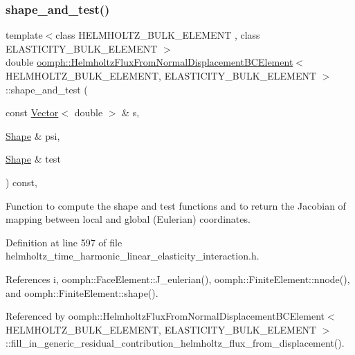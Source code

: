 \subsubsection{\texorpdfstring{shape\+\_\+and\+\_\+test()}{shape\_and\_test()}}
{\footnotesize\ttfamily template$<$class H\+E\+L\+M\+H\+O\+L\+T\+Z\+\_\+\+B\+U\+L\+K\+\_\+\+E\+L\+E\+M\+E\+NT , class E\+L\+A\+S\+T\+I\+C\+I\+T\+Y\+\_\+\+B\+U\+L\+K\+\_\+\+E\+L\+E\+M\+E\+NT $>$ \\
double \hyperlink{classoomph_1_1HelmholtzFluxFromNormalDisplacementBCElement}{oomph\+::\+Helmholtz\+Flux\+From\+Normal\+Displacement\+B\+C\+Element}$<$ H\+E\+L\+M\+H\+O\+L\+T\+Z\+\_\+\+B\+U\+L\+K\+\_\+\+E\+L\+E\+M\+E\+NT, E\+L\+A\+S\+T\+I\+C\+I\+T\+Y\+\_\+\+B\+U\+L\+K\+\_\+\+E\+L\+E\+M\+E\+NT $>$\+::shape\+\_\+and\+\_\+test (\begin{DoxyParamCaption}\item[{const \hyperlink{classoomph_1_1Vector}{Vector}$<$ double $>$ \&}]{s,  }\item[{\hyperlink{classoomph_1_1Shape}{Shape} \&}]{psi,  }\item[{\hyperlink{classoomph_1_1Shape}{Shape} \&}]{test }\end{DoxyParamCaption}) const\hspace{0.3cm}{\ttfamily [inline]}, {\ttfamily [protected]}}



Function to compute the shape and test functions and to return the Jacobian of mapping between local and global (Eulerian) coordinates. 



Definition at line 597 of file helmholtz\+\_\+time\+\_\+harmonic\+\_\+linear\+\_\+elasticity\+\_\+interaction.\+h.



References i, oomph\+::\+Face\+Element\+::\+J\+\_\+eulerian(), oomph\+::\+Finite\+Element\+::nnode(), and oomph\+::\+Finite\+Element\+::shape().



Referenced by oomph\+::\+Helmholtz\+Flux\+From\+Normal\+Displacement\+B\+C\+Element$<$ H\+E\+L\+M\+H\+O\+L\+T\+Z\+\_\+\+B\+U\+L\+K\+\_\+\+E\+L\+E\+M\+E\+N\+T, E\+L\+A\+S\+T\+I\+C\+I\+T\+Y\+\_\+\+B\+U\+L\+K\+\_\+\+E\+L\+E\+M\+E\+N\+T $>$\+::fill\+\_\+in\+\_\+generic\+\_\+residual\+\_\+contribution\+\_\+helmholtz\+\_\+flux\+\_\+from\+\_\+displacement().

\mbox{\label{classoomph_1_1HelmholtzFluxFromNormalDisplacementBCElement_ad3a879cf569b317c086f07872164f9f8}} 
